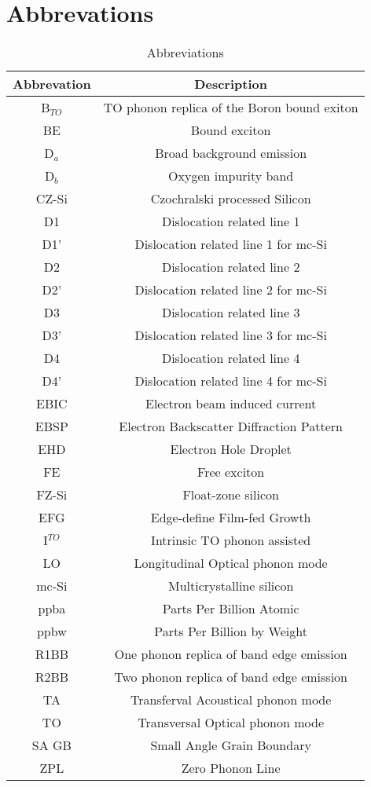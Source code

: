 		\section{Abbrevations}
		
		\begin{table}[H]
\centering
\begin{tabular}{|c|c|}
\hline

		\textbf{Abbrevation} & \textbf{Description} \\ \hline
		B$_{TO}$ & TO phonon replica of the Boron bound exiton  \\ \hline
		BE & Bound exciton \\ \hline
		D$_a$ & Broad background emission  \\ \hline
		D$_b$ & Oxygen impurity band  \\ \hline
		CZ-Si & Czochralski processed Silicon \\ \hline
		D1	& Dislocation related line 1  \\ \hline
		D1' & Dislocation related line 1 for mc-Si  \\ \hline
		D2	& Dislocation related line 2 \\ \hline
		D2' & Dislocation related line 2 for mc-Si  \\ \hline
		D3	& Dislocation related line 3  \\ \hline
		D3' & Dislocation related line 3 for mc-Si  \\ \hline
		D4	& Dislocation related line 4  \\ \hline
		D4' & Dislocation related line 4 for mc-Si  \\ \hline
		EBIC & Electron beam induced current \\ \hline
		EBSP & Electron Backscatter Diffraction Pattern \\ \hline
		EHD & Electron Hole Droplet	\\ \hline
		FE & Free exciton \\ \hline
		FZ-Si & Float-zone silicon \\ \hline
		EFG & Edge-define Film-fed Growth \\ \hline
		I$^{TO}$ & Intrinsic TO phonon assisted \\ \hline
		LO & Longitudinal Optical phonon mode \\ \hline
		mc-Si & Multicrystalline silicon \\ \hline
		ppba & Parts Per Billion Atomic \\ \hline
		ppbw & Parts Per Billion by Weight \\ \hline
		R1BB & One phonon replica of band edge emission \\ \hline
		R2BB & Two phonon replica of band edge emission \\ \hline
		TA & Transferval Acoustical phonon mode \\ \hline
		TO & Transversal Optical phonon mode \\ \hline
		SA GB & Small Angle Grain Boundary \\ \hline
		ZPL & Zero Phonon Line \\ \hline

		\end{tabular}
\caption{Abbreviations}
\label{abbreviations}
\end{table}
		
		

